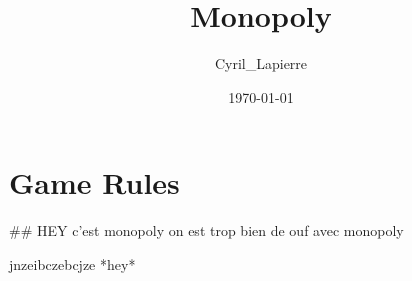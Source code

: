 \documentclass{article}%
\title{Monopoly}%
\author{Cyril\_Lapierre}%
\date{\today}%
\begin{document}
%
\pagestyle{empty}%
\normalsize%
\maketitle%
\section{Game Rules}%
\label{sec:GameRules}%
\#\# HEY c'est monopoly on est trop bien de ouf avec monopoly
\newline%

\newline%
jnzeibczebcjze *hey*

%
\end{document}
